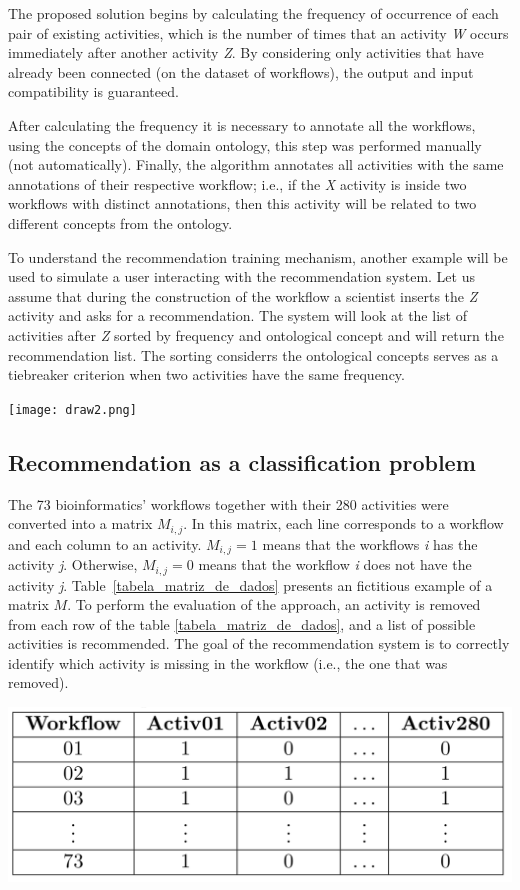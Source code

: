 \documentclass[40pt, a0, portrait]{a0poster}
\begin{document}
\begin{multicols}{2}
The proposed solution begins by calculating the frequency of occurrence of each pair of existing activities, which is the number of times that an activity \emph{W} occurs immediately after another activity \emph{Z}. By considering only activities that have already been connected (on the dataset of workflows), the output and input compatibility is guaranteed.

After calculating the frequency it is necessary to annotate all the workflows, using the concepts of the domain ontology, this step was performed manually (not automatically). Finally, the algorithm annotates all activities with the same annotations of their respective workflow; i.e., if the \emph{X} activity is inside two workflows with distinct annotations, then this activity will be related to two different concepts from the ontology. 

To understand the recommendation training mechanism, another example will be used to simulate a user interacting with the recommendation system. Let us assume that during the construction of the workflow a scientist inserts the \emph{Z} activity and asks for a recommendation. The system will look at the list of activities after \emph{Z} sorted by frequency and ontological concept and will return the recommendation list. The sorting considerrs the ontological concepts serves as a tiebreaker criterion when two activities have the same frequency.

\begin{center}
\texttt{[image: draw2.png]}
\end{center}

\subsection*{Recommendation as a classification problem}
The 73 bioinformatics' workflows together with their 280 activities were converted into a matrix $M_{i, j}$. In this matrix, each line corresponds to a workflow and each column to an activity. $M_{i, j} = 1$ means that the workflows \emph{i} has the activity \emph{j}. Otherwise, $M_{i, j} = 0$ means that the workflow \emph{i} does not have the activity \emph{j}. Table~\ref{tabela_matriz_de_dados} presents an fictitious example of a matrix \(M\). To perform the evaluation of the approach, an activity is removed from each row of the table \ref{tabela_matriz_de_dados}, and a list of possible activities is recommended. The goal of the recommendation system is to correctly identify which activity is missing in the workflow (i.e., the one that was removed).
\begin{center}
\includegraphics[width=0.8\linewidth]{matrizSimples.png}
\end{center}


\end{multicols}
\end{document}

